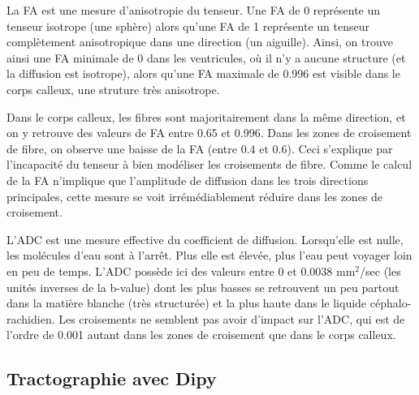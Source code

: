 \documentclass[a4paper]{article}
\begin{document}
La FA est une mesure d'anisotropie du tenseur. Une FA de 0 représente un tenseur isotrope (une sphère) alors qu'une FA de 1 représente un tenseur complètement anisotropique dans une direction (un aiguille). Ainsi, on trouve ainsi une FA minimale de 0 dans les ventricules, où il n'y a aucune structure (et la diffusion est isotrope), alors qu'une FA maximale de 0.996 est visible dans le corps calleux, une struture très anisotrope.

Dans le corps calleux, les fibres sont majoritairement dans la même direction, et on y retrouve des valeurs de FA entre 0.65 et 0.996. Dans les zones de croisement de fibre, on observe une baisse de la FA (entre 0.4 et 0.6). Ceci s'explique par l'incapacité du tenseur à bien modéliser les croisements de fibre. Comme le calcul de la FA n'implique que l'amplitude de diffusion dans les trois directions principales, cette mesure se voit irrémédiablement réduire dans les zones de croisement.

L'ADC est une mesure effective du coefficient de diffusion. Lorsqu'elle est nulle, les molécules d'eau sont à l'arrêt. Plus elle est élevée, plus l'eau peut voyager loin en peu de temps. L'ADC possède ici des valeurs entre 0 et 0.0038 mm$^2$/sec (les unités inverses de la b-value) dont les plus basses se retrouvent un peu partout dans la matière blanche (très structurée) et la plus haute dans le liquide céphalo-rachidien. Les croisements ne semblent pas avoir d'impact sur l'ADC, qui est de l'ordre de 0.001 autant dans les zones de croisement que dans le corps calleux.



\subsection{Tractographie avec Dipy}
\end{document}
